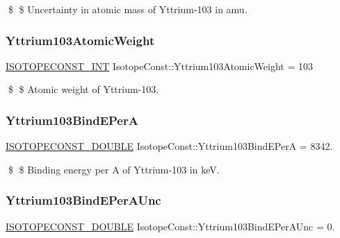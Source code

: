\$ \$ Uncertainty in atomic mass of Yttrium-\/103 in amu. \mbox{\label{group___isotope_const-_yttrium-_y103_ga030a89e53ae4991395090b4f9c7ba3b1}} 
\subsubsection{\texorpdfstring{Yttrium103\+Atomic\+Weight}{Yttrium103AtomicWeight}}
{\footnotesize\ttfamily \mbox{\hyperlink{group___isotope_const-_macros_ga5f18360b3e99483a35c32d789e62621c}{I\+S\+O\+T\+O\+P\+E\+C\+O\+N\+S\+T\+\_\+\+I\+NT}} Isotope\+Const\+::\+Yttrium103\+Atomic\+Weight = 103}

\$ \$ Atomic weight of Yttrium-\/103. \mbox{\label{group___isotope_const-_yttrium-_y103_ga39925c2236b156d105c7fc092bc02959}} 
\subsubsection{\texorpdfstring{Yttrium103\+Bind\+E\+PerA}{Yttrium103BindEPerA}}
{\footnotesize\ttfamily \mbox{\hyperlink{group___isotope_const-_macros_ga8f45a7272ce02c0b4c65c44636ed719a}{I\+S\+O\+T\+O\+P\+E\+C\+O\+N\+S\+T\+\_\+\+D\+O\+U\+B\+LE}} Isotope\+Const\+::\+Yttrium103\+Bind\+E\+PerA = 8342.}

\$ \$ Binding energy per A of Yttrium-\/103 in keV. \mbox{\label{group___isotope_const-_yttrium-_y103_gabb2a24b8d00206546a6da4e8a55fd47a}} 
\subsubsection{\texorpdfstring{Yttrium103\+Bind\+E\+Per\+A\+Unc}{Yttrium103BindEPerAUnc}}
{\footnotesize\ttfamily \mbox{\hyperlink{group___isotope_const-_macros_ga8f45a7272ce02c0b4c65c44636ed719a}{I\+S\+O\+T\+O\+P\+E\+C\+O\+N\+S\+T\+\_\+\+D\+O\+U\+B\+LE}} Isotope\+Const\+::\+Yttrium103\+Bind\+E\+Per\+A\+Unc = 0.}

